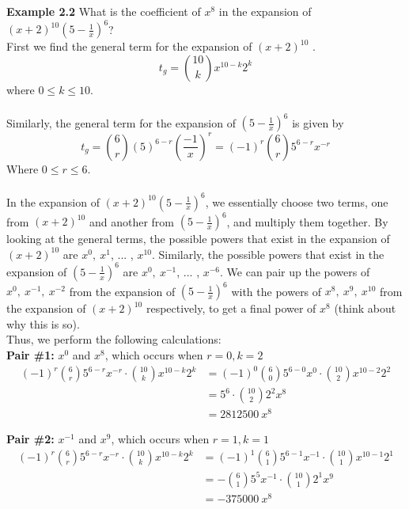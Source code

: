 \documentclass{article}
\begin{document}
\bigskip

\noindent\textbf{Example 2.2} What is the coefficient of $x^8$ in the expansion of $(x+2)^{10}(5-\frac{1}{x})^6$? \\

First we find the general term for the expansion of $(x+2)^{10}$ .
$$t_g = {10\choose k}x^{10-k}2^k$$
where $0\leq k \leq 10$.\\\\
Similarly, the general term for the expansion of $(5-\frac{1}{x})^6$ is given by
$$t_{g} = {6 \choose r}(5)^{6-r}({\frac{-1}{x}})^r = (-1)^r{6\choose r}5^{6-r}x^{-r} $$
Where $0\leq r \leq 6$. \\\\
In the expansion of $(x+2)^{10}(5-\frac{1}{x})^6$, we essentially choose two terms, one from $(x+2)^{10}$ and another from $(5-\frac{1}{x})^6$, and multiply them together. By looking at the general terms, the possible powers that exist in the expansion of $(x+2)^{10}$ are $x^{0},\:x^{1}$, ... , $x^{10}$. Similarly, the possible powers that exist in the expansion of $(5-\frac{1}{x})^6$ are $x^{0},\:x^{-1}$, ... , $x^{-6}$. We can pair up the powers of $x^{0},\:x^{-1},\:x^{-2}$ from the expansion of $(5-\frac{1}{x})^6$ with the powers of $x^{8},\:x^{9},\:x^{10}$ from the expansion of $(x+2)^{10}$ respectively, to get a final power of $x^8$ (think about why this is so). \\

Thus, we perform the following calculations:\\

\textbf{Pair \#1:} $x^{0}$ and $x^{8}$, which occurs when $r = 0,k = 2$ \\

\begin{align*}
    (-1)^r{6\choose r}5^{6-r}x^{-r} \cdot {10\choose k}x^{10-k}2^k & =(-1)^0{6\choose 0}5^{6-0}x^{0}\cdot {10\choose 2}x^{10-2}2^2 \\
    & = 5^6\cdot{10\choose 2}2^2x^8 \\
    & = 2812500\:x^8
\end{align*}

\textbf{Pair \#2:} $x^{-1}$ and $x^{9}$, which occurs when $r = 1,k = 1$ \\

\begin{align*}
    (-1)^r{6\choose r}5^{6-r}x^{-r} \cdot {10\choose k}x^{10-k}2^k & =(-1)^1{6\choose 1}5^{6-1}x^{-1}\cdot {10\choose 1}x^{10-1}2^1 \\
    & = -{6\choose 1}5^5x^{-1}\cdot{10\choose 1}2^1x^9 \\
    & = -375000\:x^8
\end{align*}
\end{document}
